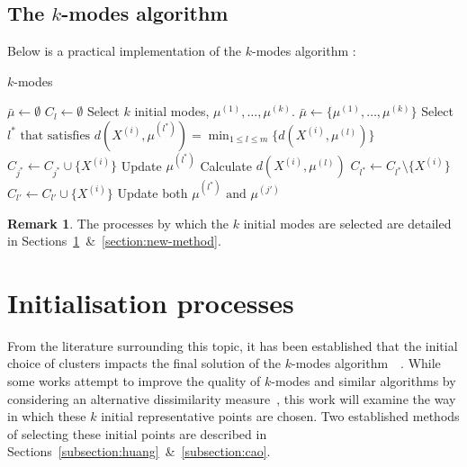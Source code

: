 \documentclass{article}
\theoremstyle{definition}
\newtheorem*{remark}{Remark}
\begin{document}
\subsection{The \(k\)-modes algorithm}\label{subsection:kmodes}

Below is a practical implementation of the \(k\)-modes algorithm \cite{Huang98}:

\begin{algorithm}[H]
    \caption{\(k\)-modes}\label{alg:kmodes}
	\begin{algorithmic}[0] 
        \State \(\bar{\mu} \gets \emptyset\)
            \State \(C_l \gets \emptyset\)
		\EndFor
        \State Select \(k\) initial modes, \(\mu^{(1)}, \ldots, \mu^{(k)}\).
        \State \(\bar{\mu} \gets \{\mu^{(1)}, \ldots, \mu^{(k)}\}\)
            \State Select \(l^* \text{ that satisfies } \displaystyle{d(X^{(i)}, 
                \mu^{(l^*)}) = \min_{1 \le l \le m} \{d(X^{(i)}, \mu^{(l)})\}}\)
            \State \(C_{j^*} \gets C_{j^*} \cup \{X^{(i)}\}\)
            \State Update \(\mu^{(l^*)}\)
		\EndFor
		\Repeat
                    \State Calculate \(d(X^{(i)}, \mu^{(l)})\)
				\EndFor
                    \State \(C_{l^*} \gets C_{l^*} \setminus \{X^{(i)}\}\)
                    \State \(C_{l'} \gets C_{l'} \cup \{X^{(i)}\}\)
                    \State Update both \(\mu^{(l^*)} \text{ and } \mu^{(j')}\)
				\EndIf
			\EndFor
	\end{algorithmic}
\end{algorithm}

\begin{remark}
    The processes by which the \(k\) initial modes are selected are detailed in 
    Sections~\ref{section:init}~\&~\ref{section:new-method}.
\end{remark}



\section{Initialisation processes}\label{section:init}

From the literature surrounding this topic, it has been established that the 
initial choice of clusters impacts the final solution of the \(k\)-modes
algorithm~\cite{Huang98}~\cite{Cao09}. While some works attempt to improve the 
quality of \(k\)-modes and similar algorithms by considering an alternative 
dissimilarity measure~\cite{Ng07}, this work will examine the way in which these
\(k\) initial representative points are chosen. Two established methods of 
selecting these initial points are described in
Sections~\ref{subsection:huang}~\&~\ref{subsection:cao}.
\end{document}
